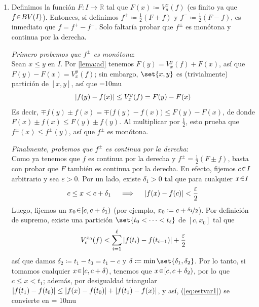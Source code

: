 \begin{sol}
\begin{enumerate}[label=(\roman*),leftmargin=1.8em]
\[
\sum_{i=1}^\ell |f(t_i) - f(t_{i-1})|
\;=\; \sum_{i=1}^\ell f(t_i) - f(t_{i-1})
\;=\; f(t_\ell)-f(t_0)
\;=\; f(b)-f(a)
\]
al tomar supremo sobre las particiones de $[a,b]$, obtenemos $V(f) = f(b)-f(a) < \infty$.
\item %
Definimos la función $F \colon I  \to \mathbb{R}$ tal que $F(x) \coloneq V^x_a(f)$ (es finito ya que $f\en BV(I)$). Entonces, si definimos $f^+\coloneq \frac12(F+f)$ y $f^-\coloneq \frac12(F-f)$, es inmediato que $f = f^+ -f^-$. Solo faltaría probar que $f^\pm$ es monótona y continua por la derecha.\par
\medskip
\emph{Primero probemos que $f^\pm$ es monótona}:\\
Sean $x \le y$ en $I$. Por \cref{lema:ad} tenemos $F(y) = V^y_x(f) + F(x)$, así que $F(y) - F(x) = V^y_x(f)$; sin embargo, $\set{x,y}$ es (trivialmente) partición de $[x,y]$, así que 
{\thickmuskip=10mu
\[\abs{f(y) - f(x)} \leq V^y_x(f) = F(y) - F(x)\]
}%
Es decir, $\mp f(y) \pm f(x) = \mp\big(f(y)-f(x)\big) \le F(y) - F(x)$, de donde $F(x) \pm f(x) \le  F(y) \pm f(y)$. Al multiplicar por $\frac12$, esto prueba que $f^{\pm}(x) \le f^{\pm}(y)$, así que $f^{\pm}$ es monótona.\par
\medskip
\emph{Finalmente, probemos que $f^{\pm}$ es continua por la derecha}:\\
Como ya tenemos que $f$ es continua por la derecha y $f^\pm= \frac12(F\pm f)$, basta con probar que $F$ también es continua por la derecha. En efecto, fijemos $c\en I$ arbitrario y sea $\varepsilon>0$. Por un lado, existe $\delta_1>0$ tal que para cualquier $x\en I$
\[
c \le x <  c+\delta_1
\quad\implies\quad
\abs{f(x) - f(c)} < \frac{\varepsilon}{2}
\]
Luego, fijemos un $x_0 \en [c,c+\delta_1)$ (por ejemplo, $x_0\coloneq c+\nicefrac{\delta_1}{2}$). Por definición de supremo, existe una partición $\set{t_0<\cdots<t_\ell}$ de $[c,x_0]$ tal que 
\begin{equation}\label{eq:estvar1} 
V_c^{x_0}(f) < \sum^\ell_{i=1}\abs{f(t_i) - f(t_{i-1})} + \frac{\varepsilon}{2}
\end{equation}
así que damos $\delta_2\coloneq t_1-t_0 = t_1 - c$ y $\delta \coloneq \min\set{\delta_1,\delta_2}$. Por lo tanto, si tomamos cualquier $x\en [c,c+\delta)$, tenemos que $x\en [c,c+\delta_2)$, por lo que $c \le x < t_1$; además, por desigualdad triangular $\abs{f(t_1)-f(t_0)} \le \abs{f(x)-f(t_0)} + \abs{f(t_1)-f(x)}$, y así, (\ref{eq:estvar1}) se convierte en%
{\thickmuskip = 10mu
\begin{equation}\label{eq:estvar2}

\end{equation}}
\end{enumerate}
\end{sol}
